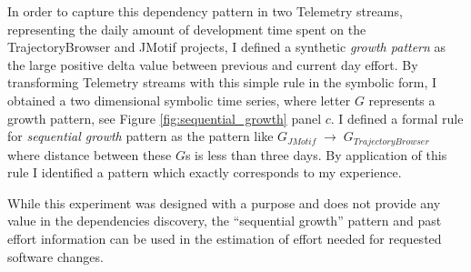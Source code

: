 In order to capture this dependency pattern in two Telemetry streams, representing the daily amount of development time spent on the TrajectoryBrowser and JMotif projects, I defined a synthetic \textit{growth pattern} as the large positive delta value between previous and current day effort. By transforming Telemetry streams with this simple rule in the symbolic form, I obtained a two dimensional symbolic time series, where letter $G$ represents a growth pattern, see Figure \ref{fig:sequential_growth} panel $c$. I defined a formal rule for \textit{sequential growth} pattern as the pattern like $G_{JMotif}\; \rightarrow \; G_{TrajectoryBrowser}$ where distance between these $G$s is less than three days. By application of this rule I identified a pattern which exactly corresponds to my experience. 

While this experiment was designed with a purpose and does not provide any value in the dependencies discovery, the ``sequential growth'' pattern and past effort information can be used in the estimation of effort needed for requested software changes.
